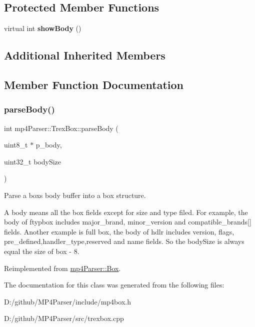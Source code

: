 \subsection*{Protected Member Functions}
\begin{DoxyCompactItemize}
\item 
\mbox{\label{classmp4_parser_1_1_trex_box_afd180fe67bdca7a81bb024dacf914167}} 
virtual int {\bfseries show\+Body} ()
\end{DoxyCompactItemize}
\subsection*{Additional Inherited Members}


\subsection{Member Function Documentation}
\mbox{\label{classmp4_parser_1_1_trex_box_af4b5616abea11f60d63af8f9070fafdf}} 
\subsubsection{\texorpdfstring{parseBody()}{parseBody()}}
{\footnotesize\ttfamily int mp4\+Parser\+::\+Trex\+Box\+::parse\+Body (\begin{DoxyParamCaption}\item[{uint8\+\_\+t $\ast$}]{p\+\_\+body,  }\item[{uint32\+\_\+t}]{body\+Size }\end{DoxyParamCaption})\hspace{0.3cm}{\ttfamily [virtual]}}



Parse a box\textquotesingle{}s body buffer into a box structure. 

A body means all the box fields except for size and type filed. For example, the body of ftypbox includes major\+\_\+brand, minor\+\_\+version and compatible\+\_\+brands\mbox{[}\mbox{]} fields. Another example is full box, the body of hdlr includes version, flags, pre\+\_\+defined,handler\+\_\+type,reserved and name fields. So the body\+Size is always equal the size of box -\/ 8. 

Reimplemented from \mbox{\hyperlink{classmp4_parser_1_1_box_a3dd0c084ac65bc77b69ac5ecaf796cb2}{mp4\+Parser\+::\+Box}}.



The documentation for this class was generated from the following files\+:\begin{DoxyCompactItemize}
\item 
D\+:/github/\+M\+P4\+Parser/include/mp4box.\+h\item 
D\+:/github/\+M\+P4\+Parser/src/trexbox.\+cpp\end{DoxyCompactItemize}
